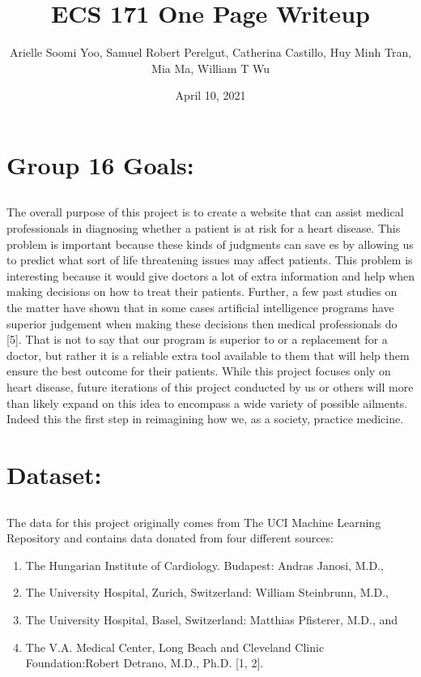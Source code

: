 \documentclass[12pt]{article}
\title{ECS 171 One Page Writeup}
\author{\small Arielle Soomi Yoo, Samuel Robert Perelgut, Catherina Castillo, Huy Minh Tran, Mia Ma, William T Wu }
\date{April 10, 2021}
\begin{document}
\maketitle

\section*{Group 16 Goals: }

\subsection*{}
The overall purpose of this project is to create a website that can assist 
medical professionals in diagnosing whether a patient is at risk for a heart 
disease. This problem is important because these kinds of judgments can save 
es by allowing us to predict what sort of life threatening issues may affect 
patients. This problem is interesting because it would give doctors a lot of 
extra information and help when making decisions on how to treat their 
patients. Further, a few past studies on the matter have shown that in some 
cases artificial intelligence programs have superior judgement when making 
these decisions then medical professionals do [5]. That is not to say that 
our program is superior to or a replacement for a doctor, but rather it is 
a reliable extra tool available to them that will help them ensure the best 
outcome for their patients. While this project focuses only on heart disease,
future iterations of this project conducted by us or others will more than 
likely expand on this idea to encompass a wide variety of possible ailments. 
Indeed this the first step in reimagining how we, as a society, practice 
medicine.

\section*{Dataset: }

\subsection*{}
The data for this project originally comes from The UCI Machine Learning Repository and contains data donated from four different sources:

\begin{enumerate}
    \item The Hungarian Institute of Cardiology. Budapest: Andras Janosi, M.D.,
    \item The University Hospital, Zurich, Switzerland: William Steinbrunn, M.D.,
    \item The University Hospital, Basel, Switzerland: Matthias Pfisterer, M.D., and
    \item The V.A. Medical Center, Long Beach and Cleveland Clinic Foundation:Robert Detrano, M.D., Ph.D. [1, 2].
    
\end{enumerate}
\end{document}
